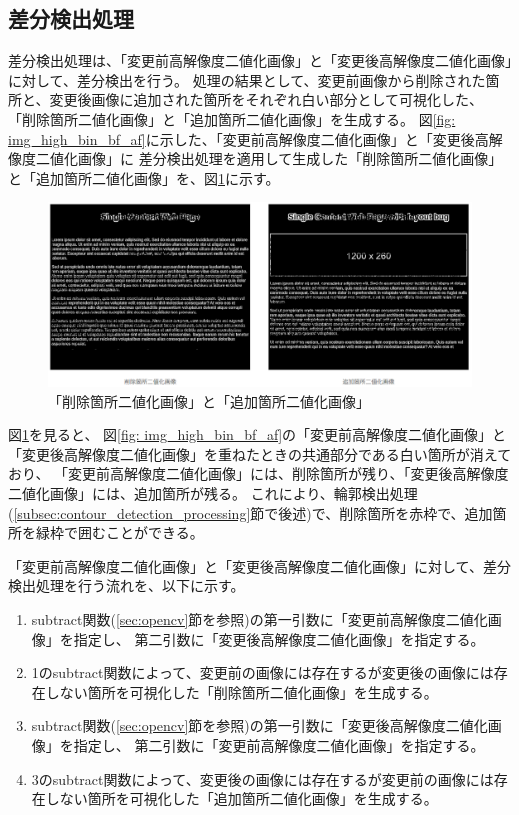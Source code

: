 \subsection{差分検出処理}\label{subsec:difference_detection_process}
差分検出処理は、「変更前高解像度二値化画像」と「変更後高解像度二値化画像」に対して、差分検出を行う。
処理の結果として、変更前画像から削除された箇所と、変更後画像に追加された箇所をそれぞれ白い部分として可視化した、
「削除箇所二値化画像」と「追加箇所二値化画像」を生成する。
図\ref{fig: img_high_bin_bf_af}に示した、「変更前高解像度二値化画像」と「変更後高解像度二値化画像」に
差分検出処理を適用して生成した「削除箇所二値化画像」と「追加箇所二値化画像」を、図\ref{fig: img_del_add_bin_bf_af}に示す。
\begin{figure}[tp]
    \begin{center}
        \includegraphics[width=1.0\columnwidth]{image/4_img_del_add_bin_bf_af.png}
        \caption{「削除箇所二値化画像」と「追加箇所二値化画像」}
        \label{fig: img_del_add_bin_bf_af}
    \end{center}
\end{figure}
図\ref{fig: img_del_add_bin_bf_af}を見ると、
図\ref{fig: img_high_bin_bf_af}の「変更前高解像度二値化画像」と「変更後高解像度二値化画像」を重ねたときの共通部分である白い箇所が消えており、
「変更前高解像度二値化画像」には、削除箇所が残り、「変更後高解像度二値化画像」には、追加箇所が残る。
これにより、輪郭検出処理(\ref{subsec:contour_detection_processing}節で後述)で、削除箇所を赤枠で、追加箇所を緑枠で囲むことができる。
\par
「変更前高解像度二値化画像」と「変更後高解像度二値化画像」に対して、差分検出処理を行う流れを、以下に示す。
\begin{enumerate}
    \item subtract関数(\ref{sec:opencv}節を参照)の第一引数に「変更前高解像度二値化画像」を指定し、
          第二引数に「変更後高解像度二値化画像」を指定する。
    \item 1のsubtract関数によって、変更前の画像には存在するが変更後の画像には存在しない箇所を可視化した「削除箇所二値化画像」を生成する。
    \item subtract関数(\ref{sec:opencv}節を参照)の第一引数に「変更後高解像度二値化画像」を指定し、
          第二引数に「変更前高解像度二値化画像」を指定する。
    \item 3のsubtract関数によって、変更後の画像には存在するが変更前の画像には存在しない箇所を可視化した「追加箇所二値化画像」を生成する。
\end{enumerate}


